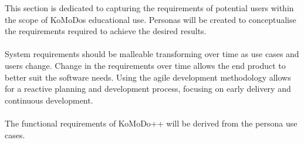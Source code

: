 \graphicspath{ {images/requirements/} }

This section is dedicated to capturing the requirements of potential users within the scope of KoMoDos educational use. Personas will be created to conceptualise the requirements required to achieve the desired results.\\\\
%
System requirements should be malleable transforming over time as use cases and users change. Change in the requirements over time allows the end product to better suit the software needs. Using the agile development methodology allows for a reactive planning and development process, focusing on early delivery and continuous development.\\\\
%
The functional requirements of KoMoDo++ will be derived from the persona use cases.

